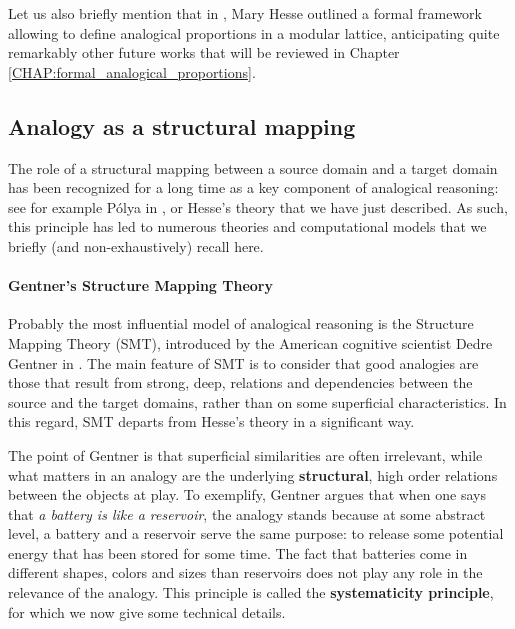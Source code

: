 Let us also briefly mention that in \cite{Hes59}, Mary Hesse outlined a formal
framework allowing to define analogical proportions in a modular lattice,
anticipating quite remarkably other future works that will be reviewed in
Chapter \ref{CHAP:formal_analogical_proportions}.

\subsection{Analogy as a structural mapping}

The role of a structural mapping between a source domain and a target domain
has been recognized for a long time as a key component of analogical reasoning:
see for example P\'olya in \cite{Pol54}, or Hesse's theory that we have just
described. As such, this principle has led to numerous theories and
computational models that we briefly (and non-exhaustively) recall here.

\paragraph{Gentner's Structure Mapping Theory\\}

Probably the most influential model of analogical reasoning is the Structure
Mapping Theory (SMT), introduced by the American cognitive scientist Dedre
Gentner in \cite{Gen83}. The main feature of SMT is to consider that good
analogies are those that result from strong, deep, relations and dependencies
between the source and the target domains, rather than on some superficial
characteristics. In this regard, SMT departs from Hesse's theory in a
significant way.

The point of Gentner is that superficial similarities are often irrelevant,
while what matters in an analogy are the underlying \textbf{structural}, high
order relations between the objects at play. To exemplify, Gentner argues that
when one says that \textit{a battery is like a reservoir}, the analogy stands
because at some abstract level, a battery and a reservoir serve the same
purpose: to release some potential energy that has been stored for some time.
The fact that batteries come in different shapes, colors and sizes than
reservoirs does not play any role in the relevance of the analogy. This
principle is called the \textbf{systematicity principle}, for which we now give
some technical details.

